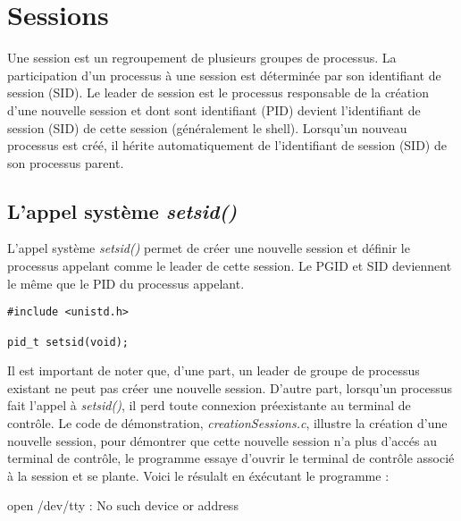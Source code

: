 \section{Sessions}
Une session est un regroupement de plusieurs groupes de processus. La participation d'un processus à une session est déterminée par son identifiant de session (SID). Le leader de session est le processus responsable de la création d'une nouvelle session et dont sont identifiant (PID) devient l'identifiant de session (SID) de cette session (généralement le shell). Lorsqu'un nouveau processus est créé, il hérite automatiquement de l'identifiant de session (SID) de son processus parent.

\subsection{L’appel système \textit{setsid()} }
L’appel système \textit{setsid()} permet de créer une nouvelle session et définir le processus appelant comme le leader de cette session. Le PGID et SID deviennent le même que le PID du processus appelant.
\newline
\begin{lstlisting}[frame=single]
#include <unistd.h>

pid_t setsid(void);
\end{lstlisting}
Il est important de noter que, d'une part, un leader de groupe de processus existant ne peut pas créer une nouvelle session. D'autre part, lorsqu'un processus fait l'appel à \textit{setsid()}, il perd toute connexion préexistante au terminal de contrôle. 
\newline
Le code de démonstration, \textit{creationSessions.c}, illustre la création d'une nouvelle session, pour démontrer que cette nouvelle session n'a plus d'accés au terminal de contrôle, le programme essaye d'ouvrir
le terminal de contrôle associé à la session et se plante. Voici le résulalt en éxécutant le programme :

open /dev/tty : No such device or address

